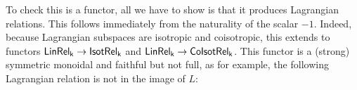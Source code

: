 \begin{lemma}
\end{lemma}
To check this is a functor, all we have to show is that it produces Lagrangian relations. This follows immediately from the naturality of the scalar $-1$.
Indeed, because Lagrangian subspaces are isotropic and coisotropic, this extends to functors $\sf LinRel_k\to{\sf Isot}\mathsf{Rel}_k$ and $\sf LinRel_k\to{\sf Co}{\sf Isot}\mathsf{Rel}_k$.
This functor is a (strong) symmetric monoidal and faithful but not full, as for example, the following Lagrangian relation is not in the image of $L$:
